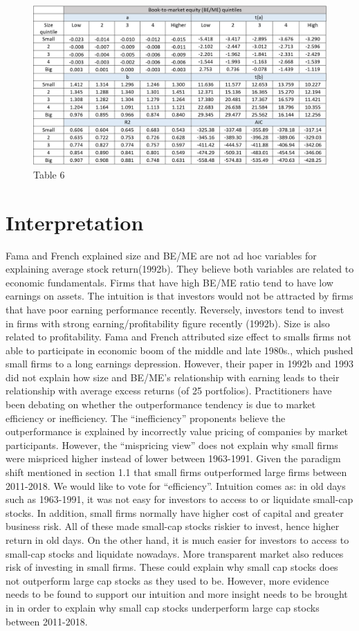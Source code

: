 \documentclass[12pt]{article}
\begin{document}
\begin{figure}[h]
	\centering
	\includegraphics[width=1\linewidth]{6.JPG}
	\caption*{Table 6}
	\label{fig:label}
\end{figure}

\section{Interpretation}

Fama and French explained size and BE/ME are not ad hoc variables for explaining average stock return(1992b). They believe both variables are related to economic fundamentals. Firms that have high BE/ME ratio tend to have low earnings on assets. The intuition is that investors would not be attracted by firms that have poor earning performance recently. Reversely, investors tend to invest in firms with strong earning/profitability figure recently (1992b). Size is also related to profitability. Fama and French attributed size effect to smalls firms not able to participate in economic boom of the middle and late 1980s., which pushed small firms to a long earnings depression. However, their paper in 1992b and 1993 did not explain how size and BE/ME’s relationship with earning leads to their relationship with average excess returns (of 25 portfolios).
Practitioners have been debating on whether the outperformance tendency is due to market efficiency or inefficiency. The “inefficiency” proponents believe the outperformance is explained by incorrectly value pricing of companies by market participants. However, the “mispricing view” does not explain why small firms were mispriced higher instead of lower between 1963-1991. 
Given the paradigm shift mentioned in section 1.1 that small firms outperformed large firms between 2011-2018. We would like to vote for “efficiency”. Intuition comes as: in old days such as 1963-1991, it was not easy for investors to access to or liquidate small-cap stocks. In addition, small firms normally have higher cost of capital and greater business risk. All of these made small-cap stocks riskier to invest, hence higher return in old days. On the other hand, it is much easier for investors to access to small-cap stocks and liquidate nowadays. More transparent market also reduces risk of investing in small firms. These could explain why small cap stocks does not outperform large cap stocks as they used to be. However, more evidence needs to be found to support our intuition and more insight needs to be brought in in order to explain why small cap stocks underperform large cap stocks between 2011-2018.
\end{document}
